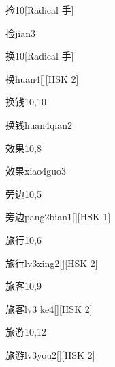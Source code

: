 \begin{entry}{捡}{10}[Radical 手]
  \begin{phonetics}{捡}{jian3}
  \end{phonetics}
\end{entry}

\begin{entry}{换}{10}[Radical 手]
  \begin{phonetics}{换}{huan4}[][HSK 2]
  \end{phonetics}
\end{entry}

\begin{entry}{换钱}{10,10}
  \begin{phonetics}{换钱}{huan4qian2}
  \end{phonetics}
\end{entry}

\begin{entry}{效果}{10,8}
  \begin{phonetics}{效果}{xiao4guo3}
  \end{phonetics}
\end{entry}

\begin{entry}{旁边}{10,5}
  \begin{phonetics}{旁边}{pang2bian1}[][HSK 1]
  \end{phonetics}
\end{entry}

\begin{entry}{旅行}{10,6}
  \begin{phonetics}{旅行}{lv3xing2}[][HSK 2]
  \end{phonetics}
\end{entry}

\begin{entry}{旅客}{10,9}
  \begin{phonetics}{旅客}{lv3 ke4}[][HSK 2]
  \end{phonetics}
\end{entry}

\begin{entry}{旅游}{10,12}
  \begin{phonetics}{旅游}{lv3you2}[][HSK 2]
  \end{phonetics}
\end{entry}

